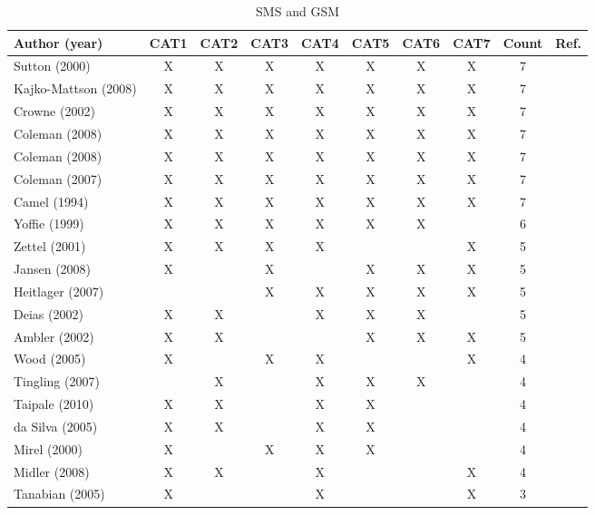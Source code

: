 \documentclass[10pt,journal,letterpaper,compsoc]{IEEEtran}
\begin{document}
\begin{table}[!t]
\renewcommand{\arraystretch}{1.3}
\caption{SMS \cite{SMS} and GSM} 
\label{tab:an:literature_comp}
\centering
\begin{tabular}{|l||c||c||c||c||c||c||c||c||c|}

\hline
Author (year) & CAT1 & CAT2 & CAT3 & CAT4 & CAT5 & CAT6 & CAT7 & Count & Ref. \\
\hline
Sutton (2000) & X & X & X & X & X & X & X & 7 & \cite{Sutton2000} \\
Kajko-Mattson (2008) & X & X & X & X & X & X & X & 7 & 
\cite{Kajko-Mattsson2008} \\
Crowne (2002) & X & X & X & X & X & X & X & 7 & \cite{Crowne2002} \\
Coleman (2008) & X & X & X & X & X & X & X & 7 & \cite{Coleman2008a} \\
Coleman (2008) & X & X & X & X & X & X & X & 7 & \cite{Coleman2008} \\
Coleman (2007) & X & X & X & X & X & X & X & 7 & \cite{Coleman2007} \\
Camel (1994) & X & X & X & X & X & X & X & 7 & \cite{Camel1994a} \\
Yoffie (1999) & X & X & X & X & X & X & & 6 & \cite{Yoffie1999} \\
Zettel (2001) & X & X & X & X & & & X & 5 & \cite{Zettel2001} \\
Jansen (2008) & X & & X & & X & X & X & 5 & \cite{Jansen2008} \\
Heitlager (2007) &  &  & X & X & X & X & X & 5 & \cite{Heitlager2007} \\
Deias (2002) & X & X & & X & X & X & & 5 & \cite{Deias} \\
Ambler (2002) & X & X &  &  & X & X & X & 5 & \cite{Ambler2002} \\
Wood (2005) & X &  & X  & X &  &  & X & 4 & \cite{Wood2005} \\
Tingling (2007) &  & X &  & X & X & X &  & 4 & \cite{Tingling2007} \\
Taipale (2010) & X & X &  & X & X &  &  & 4 & \cite{Taipale2010} \\
da Silva (2005) & X & X &  & X & X &  &  & 4 & \cite{Silva2005} \\
Mirel (2000) & X &  & X & X & X &  &  & 4 & \cite{Mirel2000} \\
Midler (2008) & X & X &  & X &  &  & X & 4 & \cite{Midler2008} \\
Tanabian (2005) & X &  &  & X &  &  & X  & 3 & \cite{Tanabian2005} \\

\end{tabular}
\end{table}
\end{document}
